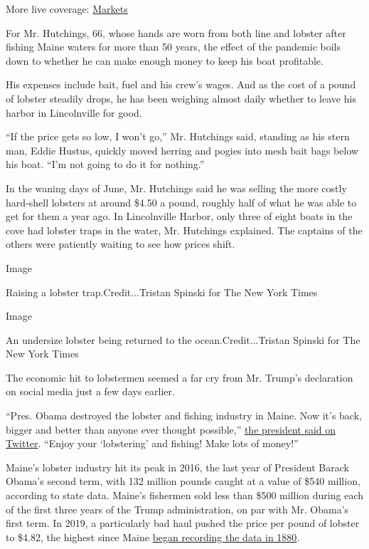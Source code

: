 More live coverage:
\href{https://www.nytimes3xbfgragh.onion/live/2020/08/17/business/stock-market-today-coronavirus?action=click\&pgtype=Article\&state=default\&region=MAIN_CONTENT_1\&context=storylines_live_updates}{Markets}

For Mr. Hutchings, 66, whose hands are worn from both line and lobster
after fishing Maine waters for more than 50 years, the effect of the
pandemic boils down to whether he can make enough money to keep his boat
profitable.

His expenses include bait, fuel and his crew's wages. And as the cost of
a pound of lobster steadily drops, he has been weighing almost daily
whether to leave his harbor in Lincolnville for good.

``If the price gets so low, I won't go,'' Mr. Hutchings said, standing
as his stern man, Eddie Hustus, quickly moved herring and pogies into
mesh bait bags below his boat. ``I'm not going to do it for nothing.''

In the waning days of June, Mr. Hutchings said he was selling the more
costly hard-shell lobsters at around \$4.50 a pound, roughly half of
what he was able to get for them a year ago. In Lincolnville Harbor,
only three of eight boats in the cove had lobster traps in the water,
Mr. Hutchings explained. The captains of the others were patiently
waiting to see how prices shift.

Image

Raising a lobster trap.Credit...Tristan Spinski for The New York Times

Image

An undersize lobster being returned to the ocean.Credit...Tristan
Spinski for The New York Times

The economic hit to lobstermen seemed a far cry from Mr. Trump's
declaration on social media just a few days earlier.

``Pres. Obama destroyed the lobster and fishing industry in Maine. Now
it's back, bigger and better than anyone ever thought possible,''
\href{https://twitter.com/realDonaldTrump/status/1275951862269829121}{the
president said on Twitter}. ``Enjoy your `lobstering' and fishing! Make
lots of money!''

Maine's lobster industry hit its peak in 2016, the last year of
President Barack Obama's second term, with 132 million pounds caught at
a value of \$540 million, according to state data. Maine's fishermen
sold less than \$500 million during each of the first three years of the
Trump administration, on par with Mr. Obama's first term. In 2019, a
particularly bad haul pushed the price per pound of lobster to \$4.82,
the highest since Maine
\href{https://www.maine.gov/dmr/commercial-fishing/landings/documents/lobster.table.pdf}{began
recording the data in 1880}.

